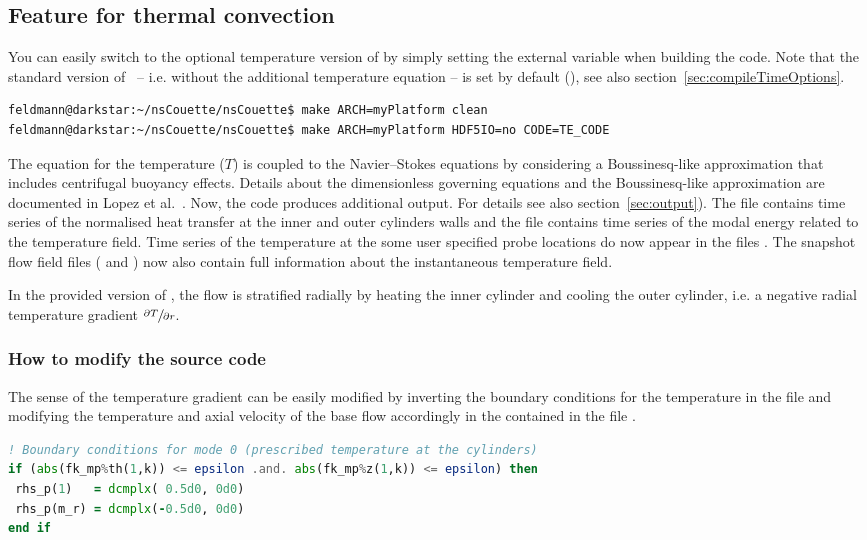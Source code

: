 \documentclass[a4paper, 11pt, DIV=11]{scrartcl}
\begin{document}
\subsection{Feature for thermal convection}
\label{sec:thermalConvection}

You can easily switch to the optional temperature version of \nsc by simply
setting the external variable  when building the code.
Note that the standard version of \nsc~-- i.e. without the additional
temperature equation -- is set by default (), see also
section~\ref{sec:compileTimeOptions}.
\begin{lstlisting}[language=bash]
feldmann@darkstar:~/nsCouette/nsCouette$ make ARCH=myPlatform clean
feldmann@darkstar:~/nsCouette/nsCouette$ make ARCH=myPlatform HDF5IO=no CODE=TE_CODE
\end{lstlisting}
\par
The equation for the temperature ($T$) is coupled to the Navier--Stokes
equations by considering a Boussinesq-like approximation that includes
centrifugal buoyancy effects. Details about the dimensionless governing
equations and the Boussinesq-like approximation are documented in Lopez
et al.~\cite{Lopez2013}. Now, the code produces additional output. For
details see also section~\ref{sec:output}). The file 
contains time series of the normalised heat transfer at the inner and
outer cylinders walls and the file  contains time
series of the modal energy related to the temperature field. Time series
of the temperature at the some user specified probe locations do now
appear in the files . The snapshot flow field files
( and ) now also contain full information
about the instantaneous temperature field.
\par
In the provided version of \nsc, the flow is stratified radially by
heating the inner cylinder and cooling the outer cylinder, i.e. a
negative radial temperature gradient $\sfrac{\partial T}{\partial r}$.

\subsubsection{How to modify the source code}


The sense of the temperature gradient can be easily modified by inverting
the boundary conditions for the temperature in the file 
and modifying the temperature and axial velocity of the base flow accordingly
in the  contained in the file .
\begin{lstlisting}[language=Fortran]
! Boundary conditions for mode 0 (prescribed temperature at the cylinders)  
if (abs(fk_mp%th(1,k)) <= epsilon .and. abs(fk_mp%z(1,k)) <= epsilon) then  
 rhs_p(1)   = dcmplx( 0.5d0, 0d0) 
 rhs_p(m_r) = dcmplx(-0.5d0, 0d0) 
end if
\end{lstlisting}
\end{document}
